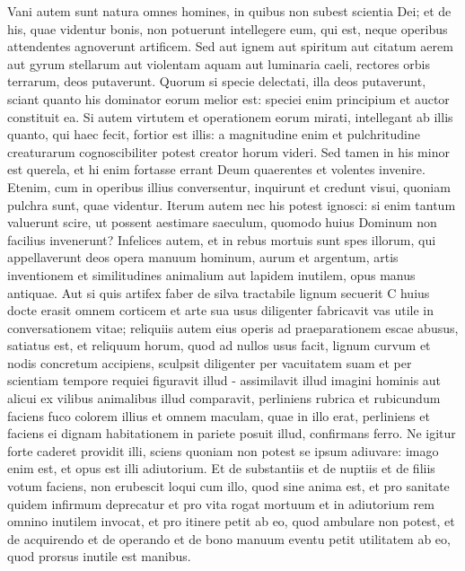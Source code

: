 \begin{biblechapter}  
\verse Vani autem sunt natura omnes homines, in quibus non subest scientia Dei; et de his, quae videntur bonis, non potuerunt intellegere eum, qui est, neque operibus attendentes agnoverunt artificem. 
\verse Sed aut ignem aut spiritum aut citatum aerem aut gyrum stellarum aut violentam aquam aut luminaria caeli, rectores orbis terrarum, deos putaverunt. 
\verse Quorum si specie delectati, illa deos putaverunt, sciant quanto his dominator eorum melior est: speciei enim principium et auctor constituit ea. 
\verse Si autem virtutem et operationem eorum mirati, intellegant ab illis quanto, qui haec fecit, fortior est illis: 
\verse a magnitudine enim et pulchritudine creaturarum cognoscibiliter potest creator horum videri. 
\verse Sed tamen in his minor est querela, et hi enim fortasse errant Deum quaerentes et volentes invenire. 
\verse Etenim, cum in operibus illius conversentur, inquirunt et credunt visui, quoniam pulchra sunt, quae videntur. 
\verse Iterum autem nec his potest ignosci: 
\verse si enim tantum valuerunt scire, ut possent aestimare saeculum, quomodo huius Dominum non facilius invenerunt? 
\verse Infelices autem, et in rebus mortuis sunt spes illorum, qui appellaverunt deos opera manuum hominum, aurum et argentum, artis inventionem et similitudines animalium aut lapidem inutilem, opus manus antiquae. 
\verse Aut si quis artifex faber de silva tractabile lignum secuerit C huius docte erasit omnem corticem et arte sua usus diligenter fabricavit vas utile in conversationem vitae; 
\verse reliquiis autem eius operis ad praeparationem escae abusus, satiatus est, 
\verse et reliquum horum, quod ad nullos usus facit, lignum curvum et nodis concretum accipiens, sculpsit diligenter per vacuitatem suam et per scientiam tempore requiei figuravit illud - assimilavit illud imagini hominis 
\verse aut alicui ex vilibus animalibus illud comparavit, perliniens rubrica et rubicundum faciens fuco colorem illius et omnem maculam, quae in illo erat, perliniens 
\verse et faciens ei dignam habitationem in pariete posuit illud, confirmans ferro. 
\verse Ne igitur forte caderet providit illi, sciens quoniam non potest se ipsum adiuvare: imago enim est, et opus est illi adiutorium. 
\verse Et de substantiis et de nuptiis et de filiis votum faciens, non erubescit loqui cum illo, quod sine anima est, et pro sanitate quidem infirmum deprecatur 
\verse et pro vita rogat mortuum et in adiutorium rem omnino inutilem invocat, et pro itinere petit ab eo, quod ambulare non potest, 
\verse et de acquirendo et de operando et de bono manuum eventu petit utilitatem ab eo, quod prorsus inutile est manibus. 
\end{biblechapter}

